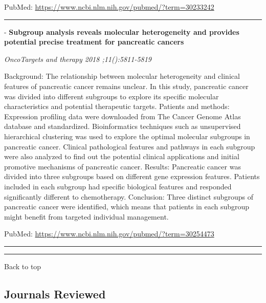 \documentclass[]{article}
\begin{document}
PubMed: \url{https://www.ncbi.nlm.nih.gov/pubmed/?term=30233242}

{}

{}

\begin{center}\rule{0.5\linewidth}{\linethickness}\end{center}

 - \textbf{Subgroup analysis reveals molecular heterogeneity and
provides potential precise treatment for pancreatic cancers}

\emph{OncoTargets and therapy 2018 ;11():5811-5819}

Background: The relationship between molecular heterogeneity and
clinical features of pancreatic cancer remains unclear. In this study,
pancreatic cancer was divided into different subgroups to explore its
specific molecular characteristics and potential therapeutic targets.
Patients and methods: Expression profiling data were downloaded from The
Cancer Genome Atlas database and standardized. Bioinformatics techniques
such as unsupervised hierarchical clustering was used to explore the
optimal molecular subgroups in pancreatic cancer. Clinical pathological
features and pathways in each subgroup were also analyzed to find out
the potential clinical applications and initial promotive mechanisms of
pancreatic cancer. Results: Pancreatic cancer was divided into three
subgroups based on different gene expression features. Patients included
in each subgroup had specific biological features and responded
significantly different to chemotherapy. Conclusion: Three distinct
subgroups of pancreatic cancer were identified, which means that
patients in each subgroup might benefit from targeted individual
management.

PubMed: \url{https://www.ncbi.nlm.nih.gov/pubmed/?term=30254473}

{}

{}

\begin{center}\rule{0.5\linewidth}{\linethickness}\end{center}

\begin{center}\rule{0.5\linewidth}{\linethickness}\end{center}

Back to top

\pagebreak

\hypertarget{journals-reviewed}{%
\subsection{Journals Reviewed}\label{journals-reviewed}}
\end{document}
